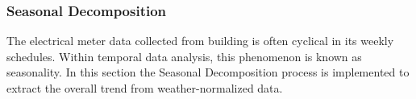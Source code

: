 \subsubsection{Seasonal Decomposition}
\label{sec:seasonaldecomposition}

The electrical meter data collected from building is often cyclical in its weekly schedules. Within temporal data analysis, this phenomenon is known as seasonality. In this section the Seasonal Decomposition process is implemented to extract the overall trend from weather-normalized data.